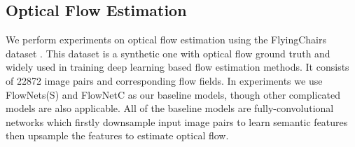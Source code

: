 \documentclass[runningheads]{llncs}
\begin{document}
\subsection{Optical Flow Estimation}
We perform experiments on optical flow estimation using the FlyingChairs dataset \cite{DFIB15}. 
This dataset is a synthetic one with optical flow ground truth and widely used in training deep learning based flow estimation methods. 
It consists of 22872 image pairs and corresponding flow fields. 
In experiments we use FlowNets(S) and FlowNetC \cite{ilg2016flownet} as our baseline models, though other complicated models are also applicable. 
All of the baseline models are fully-convolutional networks which firstly downsample input image pairs to learn semantic features then upsample the features to estimate optical flow.
\end{document}
